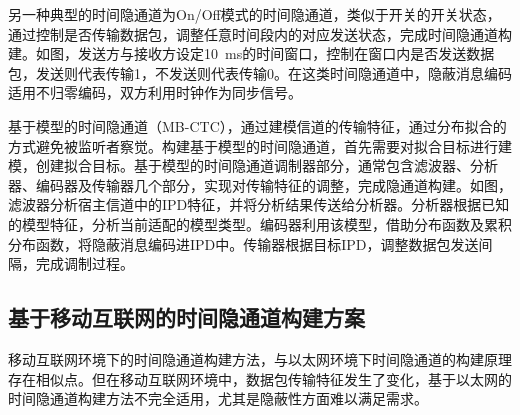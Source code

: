 另一种典型的时间隐通道为On/Off模式的时间隐通道，类似于开关的开关状态，通过控制是否传输数据包，调整任意时间段内的对应发送状态，完成时间隐通道构建。如图，发送方与接收方设定{10\ ms}的时间窗口，控制在窗口内是否发送数据包，发送则代表传输1，不发送则代表传输0。在这类时间隐通道中，隐蔽消息编码适用不归零编码，双方利用时钟作为同步信号。

基于模型的时间隐通道（MB-CTC），通过建模信道的传输特征，通过分布拟合的方式避免被监听者察觉。构建基于模型的时间隐通道，首先需要对拟合目标进行建模，创建拟合目标。基于模型的时间隐通道调制器部分，通常包含滤波器、分析器、编码器及传输器几个部分，实现对传输特征的调整，完成隐通道构建。如图，滤波器分析宿主信道中的IPD特征，并将分析结果传送给分析器。分析器根据已知的模型特征，分析当前适配的模型类型。编码器利用该模型，借助分布函数及累积分布函数，将隐蔽消息编码进IPD中。传输器根据目标IPD，调整数据包发送间隔，完成调制过程。

\subsection{基于移动互联网的时间隐通道构建方案}
\label{chap:backinfo:ctc:mobile}
移动互联网环境下的时间隐通道构建方法，与以太网环境下时间隐通道的构建原理存在相似点。但在移动互联网环境中，数据包传输特征发生了变化，基于以太网的时间隐通道构建方法不完全适用，尤其是隐蔽性方面难以满足需求。

